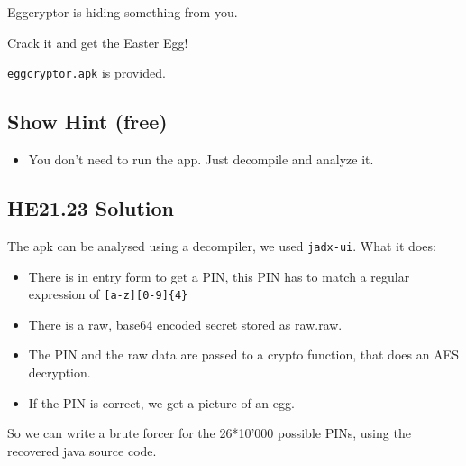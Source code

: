 \documentclass[english,a4paper,nols,noindent]{tufte-handout}
\begin{document}
\noindent Eggcryptor is hiding something from you.

Crack it and get the Easter Egg!

\verb+eggcryptor.apk+ is provided.
\subsection{Show Hint (free)}
\begin{itemize}
\item You don't need to run the app. Just decompile and analyze it.
\end{itemize}


\hypertarget{he21.23-solution}{%
\subsection{HE21.23 Solution}\label{he21.23-solution}}

\noindent The apk can be analysed using a decompiler, we used \verb+jadx-ui+.  What it does:
\begin{itemize} 
    \item There is in entry form to get a PIN, this PIN has to match a regular expression of \verb+[a-z][0-9]{4}+
    \item There is a raw, base64 encoded secret stored as raw.raw.
    \item The PIN and the raw data are passed to a crypto function, that does an AES decryption.
    \item If the PIN is correct, we get a picture of an egg.
\end{itemize}

So we can write a brute forcer for the 26*10'000 possible PINs, using the recovered java source code.
\end{document}
